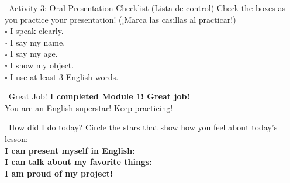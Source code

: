 \begin{activity}{ \ Activity 3: Oral Presentation Checklist (Lista de control)}
  Check the boxes as you practice your presentation! (¡Marca las casillas al practicar!)\\[1em]
  $\square$ I speak clearly.\\
  $\square$ I say my name.\\
  $\square$ I say my age.\\
  $\square$ I show my object.\\
  $\square$ I use at least 3 English words.
\end{activity}

\vspace{1em}
\begin{grammartip}{ \ Great Job!}
  \textbf{I completed Module 1! Great job!}\\
  You are an English superstar! Keep practicing!
\end{grammartip}

\vspace{1em}
\begin{grammartip}{ \ How did I do today?}
  Circle the stars that show how you feel about today's lesson:\\[6pt]
  \textbf{I can present myself in English:} \selfcheck[0] \\[4pt]
  \textbf{I can talk about my favorite things:} \selfcheck[0] \\[4pt]
  \textbf{I am proud of my project!} \selfcheck[0]
\end{grammartip}
